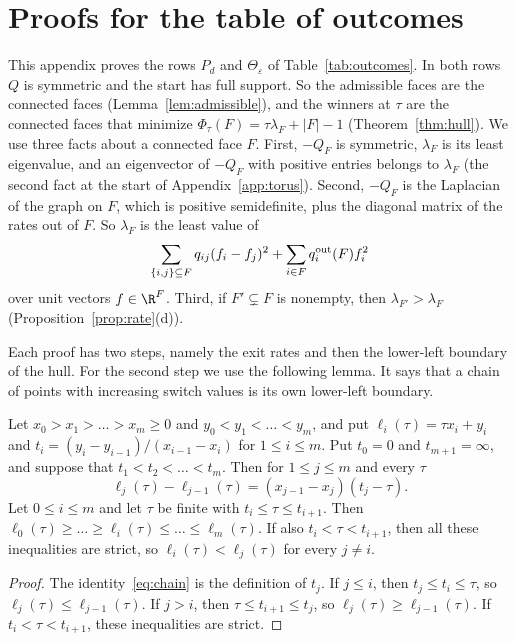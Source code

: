 \section{Proofs for the table of outcomes}\label{app:examples}

This appendix proves the rows $P_d$ and $\Theta_\varepsilon$ of
Table~\ref{tab:outcomes}. In both rows $Q$ is symmetric and the start has full
support. So the admissible faces are the connected faces
(Lemma~\ref{lem:admissible}), and the winners at $\tau$ are the connected faces
that minimize $\Phi_\tau(F)=\tau\lambda_F+\lvert F\rvert-1$
(Theorem~\ref{thm:hull}). We use three facts about a connected face $F$. First,
$-Q_F$ is symmetric, $\lambda_F$ is its least eigenvalue, and an eigenvector of
$-Q_F$ with positive entries belongs to $\lambda_F$ (the second fact at the
start of Appendix~\ref{app:torus}). Second, $-Q_F$ is the Laplacian of the
graph on $F$, which is positive semidefinite, plus the diagonal matrix of the
rates out of $F$. So $\lambda_F$ is the least value of
\begin{equation}\label{eq:rayleigh}
 \sum_{\{i,j\}\subseteq F}q_{ij}(f_i-f_j)^2+\sum_{i\in F}q_i^{\rm out}(F)f_i^2
\end{equation}
over unit vectors $f\in\R^F$. Third, if $F'\subsetneq F$ is nonempty, then
$\lambda_{F'}>\lambda_F$ (Proposition~\ref{prop:rate}(d)).

Each proof has two steps, namely the exit rates and then the lower-left boundary
of the hull. For the second step we use the following lemma. It says that a
chain of points with increasing switch values is its own lower-left boundary.

\begin{lemma}\label{lem:chain}
Let $x_0>x_1>\dots>x_m\ge0$ and $y_0<y_1<\dots<y_m$, and put
$\ell_i(\tau)=\tau x_i+y_i$ and $t_i=(y_i-y_{i-1})/(x_{i-1}-x_i)$ for
$1\le i\le m$. Put $t_0=0$ and $t_{m+1}=\infty$, and suppose that
$t_1<t_2<\dots<t_m$. Then for $1\le j\le m$ and every $\tau$
\begin{equation}\label{eq:chain}
 \ell_j(\tau)-\ell_{j-1}(\tau)=(x_{j-1}-x_j)(t_j-\tau).
\end{equation}
Let $0\le i\le m$ and let $\tau$ be finite with $t_i\le\tau\le t_{i+1}$. Then
$\ell_0(\tau)\ge\dots\ge\ell_i(\tau)\le\dots\le\ell_m(\tau)$. If also
$t_i<\tau<t_{i+1}$, then all these inequalities are strict, so
$\ell_i(\tau)<\ell_j(\tau)$ for every $j\ne i$.
\end{lemma}

\begin{proof}
The identity~\eqref{eq:chain} is the definition of $t_j$. If $j\le i$, then
$t_j\le t_i\le\tau$, so $\ell_j(\tau)\le\ell_{j-1}(\tau)$. If $j>i$, then
$\tau\le t_{i+1}\le t_j$, so $\ell_j(\tau)\ge\ell_{j-1}(\tau)$. If
$t_i<\tau<t_{i+1}$, these inequalities are strict.
\end{proof}

